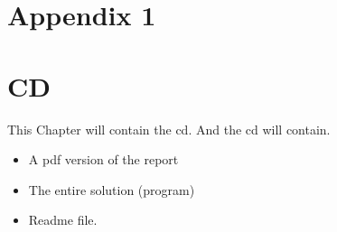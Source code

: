 \appendix

\chapter{Appendix 1} \label{ssec:appendix 1}

\label{FIRSTAPPENDIX} %


\chapter{CD}
This Chapter will contain the cd. And the cd will contain.
\begin{itemize}
\item A pdf version of the report
\item The entire solution (program)
\item Readme file.
\end{itemize}


\label{app:CD}






\label{LASTAPPENDIX}
